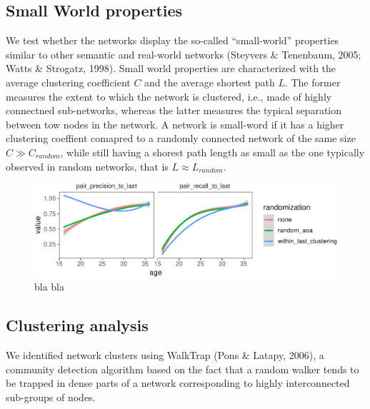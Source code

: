 \documentclass[11pt]{article}
\newenvironment{CodeChunk}{}{}
\begin{document}
\subsection{Small World properties}\label{small-world-properties}

We test whether the networks display the so-called ``small-world''
properties similar to other semantic and real-world networks (Steyvers
\& Tenenbaum, 2005; Watts \& Strogatz, 1998). Small world properties are
characterized with the average clustering coefficient \(C\) and the
average shortest path \(L\). The former measures the extent to which the
network is clustered, i.e., made of highly connectned sub-networks,
whereas the latter measures the typical separation between tow nodes in
the network. A network is small-word if it has a higher clustering
coeffient comapred to a randomly connected network of the same size
\(C \gg C_{random}\), while still having a shorest path length as small
as the one typically observed in random networks, that is
\(L \approx L_{random}\).

\begin{CodeChunk}
\captionsetup{width=0.8\textwidth}\begin{figure}[h]

{\centering \includegraphics{figs/unnamed-chunk-2-1} 

}

\caption[bla bla]{bla bla}\label{fig:unnamed-chunk-2}
\end{figure}
\end{CodeChunk}

\subsection{Clustering analysis}\label{clustering-analysis}

We identified network clusters using WalkTrap (Pons \& Latapy, 2006), a
community detection algorithm based on the fact that a random walker
tends to be trapped in dense parts of a network corresponding to highly
interconnected sub-groups of nodes.
\end{document}
